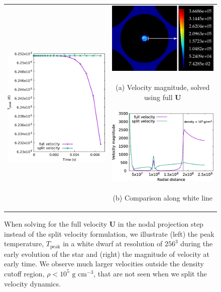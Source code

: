 \begin{figure}[htb]
\begin{center}
\begin{tabular}{l c}
\multirow{4}{3.25in}[30mm]{ \includegraphics[width=3.0in]{./figs/wdconvect_256_splitU} } & \multicolumn{1}{c}{\includegraphics[width=2.35in]{./figs/magvel_full_XY}} \\
& \multicolumn{1}{c}{\begin{footnotesize} (a) Velocity magnitude, solved using full $\mathbf{U}$ \end{footnotesize}} \\[1.em]
& \multicolumn{1}{c}{\includegraphics[width=2.5in]{./figs/magvel_lineout_X}} \\ 
& \multicolumn{1}{c}{\begin{footnotesize} (b) Comparison along white line \end{footnotesize}} \\
\end{tabular}
\caption{\label{fig:wdconvect_splitU} When solving for the full velocity $\mathbf{U}$ in the nodal projection step instead of the split velocity 
  formulation, we illustrate
  (left) the peak temperature, $T_{\text{peak}}$ in a white dwarf at resolution of $256^3$ during the early evolution of the star and
  (right) the magnitude of velocity at early time. We observe much larger velocities outside the density cutoff region, $\rho < 10^5 \text{ g cm}^{-3}$, 
  that are not seen when we split the velocity dynamics.}
\end{center}
\end{figure}
